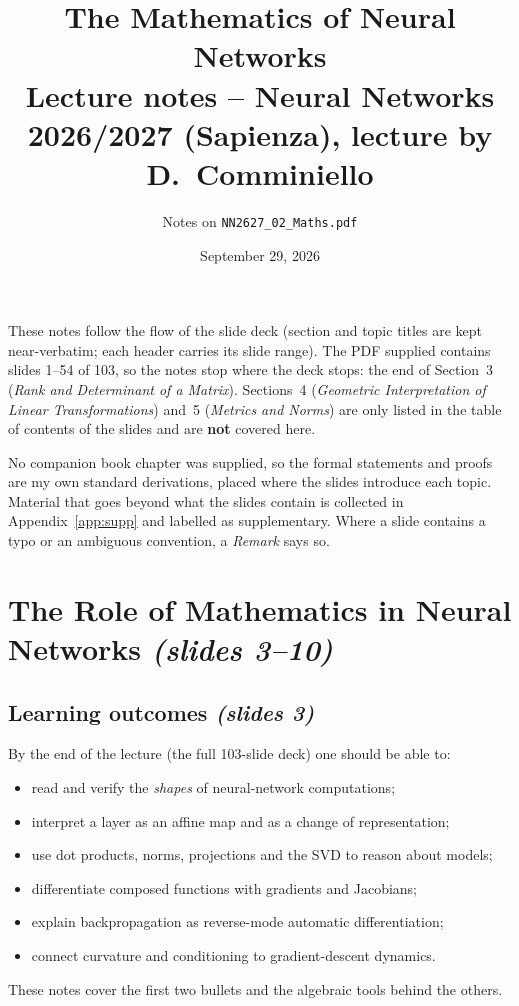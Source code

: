 \documentclass[11pt,a4paper]{article}
\title{\textbf{The Mathematics of Neural Networks}\\[2pt]
\large Lecture notes -- Neural Networks 2026/2027 (Sapienza), lecture by D.~Comminiello}
\author{Notes on \texttt{NN2627\_02\_Maths.pdf}}
\date{September 29, 2026}
\newcommand{\slides}[1]{\texorpdfstring{\emph{(slides #1)}}{(slides #1)}}
\theoremstyle{definition}
\theoremstyle{plain}
\begin{document}
\maketitle
\tableofcontents

\begin{tcolorbox}[colback=gray!6,colframe=gray!60,boxrule=0.5pt,arc=2pt,title={\small\bfseries Scope of these notes}]
\small
These notes follow the flow of the slide deck (section and topic titles are kept near-verbatim; each header carries its slide range). The PDF supplied contains slides 1--54 of 103, so the notes stop where the deck stops: the end of Section~3 (\emph{Rank and Determinant of a Matrix}). Sections~4 (\emph{Geometric Interpretation of Linear Transformations}) and~5 (\emph{Metrics and Norms}) are only listed in the table of contents of the slides and are \textbf{not} covered here.

No companion book chapter was supplied, so the formal statements and proofs are my own standard derivations, placed where the slides introduce each topic. Material that goes beyond what the slides contain is collected in Appendix~\ref{app:supp} and labelled as supplementary. Where a slide contains a typo or an ambiguous convention, a \emph{Remark} says so.
\end{tcolorbox}

\section{The Role of Mathematics in Neural Networks \slides{3--10}}

\subsection{Learning outcomes \slides{3}}

By the end of the lecture (the full 103-slide deck) one should be able to:
\begin{itemize}
  \item read and verify the \emph{shapes} of neural-network computations;
  \item interpret a layer as an affine map and as a change of representation;
  \item use dot products, norms, projections and the SVD to reason about models;
  \item differentiate composed functions with gradients and Jacobians;
  \item explain backpropagation as reverse-mode automatic differentiation;
  \item connect curvature and conditioning to gradient-descent dynamics.
\end{itemize}
These notes cover the first two bullets and the algebraic tools behind the others.
\end{document}
